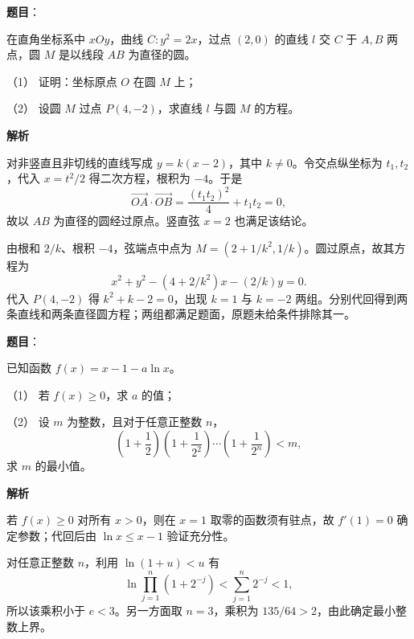 \begin{answer}

\textbf{题目}：

在直角坐标系中 \(xOy\)，曲线 \(C:y^2=2x\)，过点 \((2,0)\) 的直线 \(l\) 交 \(C\) 于 \(A,B\) 两点，圆 \(M\) 是以线段 \(AB\) 为直径的圆。

   （1） 证明：坐标原点 \(O\) 在圆 \(M\) 上；

   （2） 设圆 \(M\) 过点 \(P(4,-2)\)，求直线 \(l\) 与圆 \(M\) 的方程。

\textbf{解析}


对非竖直且非切线的直线写成 \(y=k(x-2)\)，其中 \(k\ne0\)。令交点纵坐标为 \(t_1,t_2\)，代入 \(x=t^2/2\) 得二次方程，根积为 \(-4\)。于是
\nopagebreak[4]
\[
\overrightarrow{OA}\cdot\overrightarrow{OB}=\frac{(t_1t_2)^2}{4}+t_1t_2=0,
\]
故以 \(AB\) 为直径的圆经过原点。竖直弦 \(x=2\) 也满足该结论。


由根和 \(2/k\)、根积 \(-4\)，弦端点中点为 \(M=(2+1/k^2,1/k)\)。圆过原点，故其方程为
\nopagebreak[4]
\[
x^2+y^2-(4+2/k^2)x-(2/k)y=0.
\]
代入 \(P(4,-2)\) 得 \(k^2+k-2=0\)，出现 \(k=1\) 与 \(k=-2\) 两组。分别代回得到两条直线和两条直径圆方程；两组都满足题面，原题未给条件排除其一。



\end{answer}
\begin{answer}

\textbf{题目}：

已知函数 \(f(x)=x-1-a\ln x\)。

   （1） 若 \(f(x)\ge0\)，求 \(a\) 的值；

   （2） 设 \(m\) 为整数，且对于任意正整数 \(n\)，
\nopagebreak[4]
\[
   \left(1+\frac12\right)\left(1+\frac1{2^2}\right)\cdots\left(1+\frac1{2^n}\right)<m,
\]
   求 \(m\) 的最小值。

\textbf{解析}


若 \(f(x)\ge0\) 对所有 \(x>0\)，则在 \(x=1\) 取零的函数须有驻点，故 \(f'(1)=0\) 确定参数；代回后由 \(\ln x\le x-1\) 验证充分性。


对任意正整数 \(n\)，利用 \(\ln(1+u)<u\) 有
\nopagebreak[4]
\[
\ln\prod_{j=1}^{n}(1+2^{-j})<\sum_{j=1}^{n}2^{-j}<1,
\]
所以该乘积小于 \(e<3\)。另一方面取 \(n=3\)，乘积为 \(135/64>2\)，由此确定最小整数上界。



\end{answer}
